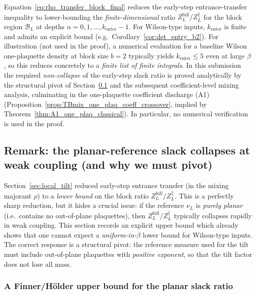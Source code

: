 \begin{remark}
Equation~\eqref{eq:rho_transfer_block_final} reduces the early-step entrance-transfer inequality to
lower-bounding the \emph{finite-dimensional} ratio $Z_L^{\mathrm{full}}/Z_L^{\parallel}$ for the
block region $\mathcal B_L$ at depths $n=0,1,\dots,k_{\mathrm{enter}}-1$.
For Wilson-type inputs, $k_{\mathrm{enter}}$ is finite and admits an explicit bound (e.g.\ Corollary~\ref{cor:det_entry_b2}).
	For illustration (not used in the proof), a numerical evaluation for a baseline Wilson one-plaquette density at block size $b=2$
	typically yields $k_{\mathrm{enter}}\le 5$ even at large $\beta$, so this reduces concretely to a \emph{finite list of finite integrals}.
	In this submission the required \emph{non-collapse} of the early-step slack ratio is proved analytically by the structural pivot of
	Section~\ref{sec:slack_collapse} and the subsequent coefficient-level mixing analysis, culminating in the one-plaquette coefficient discharge (A1)
	(Proposition~\ref{prop:TBmix_one_plaq_coeff_crossover}, implied by Theorem~\ref{thm:A1_one_plaq_classical}).
	In particular, no numerical verification is used in the proof.
\end{remark}

\subsection{Remark: the planar-reference slack collapses at weak coupling (and why we must pivot)}\label{sec:slack_collapse}

Section~\ref{sec:local_tilt} reduced early-step entrance transfer (in the mixing majorant $\rho$) to a
\emph{lower bound} on the block ratio $Z_L^{\mathrm{full}}/Z_L^{\parallel}$.
This is a perfectly sharp reduction, but it hides a crucial issue:
if the reference $\nu_L$ is \emph{purely planar} (i.e.\ contains no out-of-plane plaquettes),
then $Z_L^{\mathrm{full}}/Z_L^{\parallel}$ typically collapses rapidly in weak coupling.
This section records an explicit upper bound which already shows that one cannot expect a
\emph{uniform-in-$\beta$} lower bound for Wilson-type inputs.
The correct response is a structural pivot: the reference measure used for the tilt must
include out-of-plane plaquettes with \emph{positive exponent}, so that the tilt factor does not lose all mass.

\subsubsection{A Finner/H\"older upper bound for the planar slack ratio}

